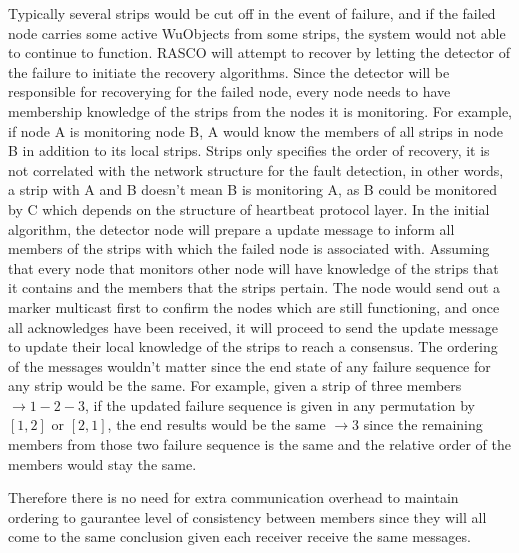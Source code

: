 Typically several strips would be cut off in the event of failure, and if the
failed node carries some active WuObjects from some strips, the system would
not able to continue to function. RASCO will attempt to recover by letting the
detector of the failure to initiate the recovery algorithms.
Since the detector will be responsible for recoverying for the failed node,
every node needs to have membership knowledge of the strips from the nodes it
is monitoring. For example, if node A is monitoring node B, A would know the
members of all strips in node B in addition to its local strips. Strips only
specifies the order of recovery, it is not correlated with the network
structure for the fault detection, in other words, a strip with A and B doesn't
mean B is monitoring A, as B could be monitored by C which depends on the
structure of heartbeat protocol layer.
In the initial algorithm, the detector node will prepare a update message to
inform all members of the strips with which the failed node is associated with.
Assuming that every node that monitors other node will have knowledge of the
strips that it contains and the members that the strips pertain. The node would
send out a marker multicast first to confirm the nodes which are still
functioning, and once all acknowledges have been received, it will proceed to
send the update message to update their local knowledge of the strips to reach
a consensus. The ordering of the messages wouldn't matter since the end state
of any failure sequence for any strip would be the same. For example, given
a strip of three members $\rightarrow 1-2-3$, if the updated failure sequence
is given in any permutation by $[1, 2]$ or $[2, 1]$, the end results would be
the same $\rightarrow 3$ since the remaining members from those two failure
sequence is the same and the relative order of the members would stay the same.

Therefore there is no need for extra communication overhead to maintain
ordering to gaurantee level of consistency between members since they will all
come to the same conclusion given each receiver receive the same messages.

